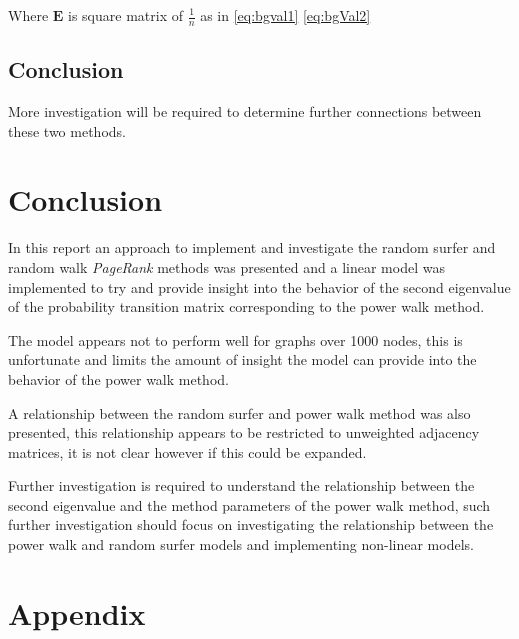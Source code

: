 \documentclass[11pt, twoside]{report}
\begin{document}
Where \(\mathbf{E}\) is square matrix of \(\frac{1}{n}\) as in \eqref{eq:bgval1}  \eqref{eq:bgVal2}

\subsection{Conclusion}
\label{sec:orgad79e88}
More investigation will be required to determine further connections between these two methods.

\section{Conclusion}
\label{sec:orgc228632}
In this report an approach to implement and investigate the random surfer and random walk \emph{PageRank} methods was presented and a linear model was implemented to try and provide insight into the behavior of the second eigenvalue of the probability transition matrix corresponding to the power walk method.

The model appears not to perform well for graphs over 1000 nodes, this is unfortunate and limits the amount of insight the model can provide into the behavior of the power walk method.

A relationship between the random surfer and power walk method was also presented, this relationship appears to be restricted to unweighted adjacency matrices, it is not clear however if this could be expanded.

Further investigation is required to understand the relationship between the
second eigenvalue and the method parameters of the power walk method, such
further investigation should focus on investigating the relationship between the
power walk and random surfer models and implementing non-linear models.


\section{Appendix}
\label{sec:orgdf858c5}
\appendix
\end{document}
